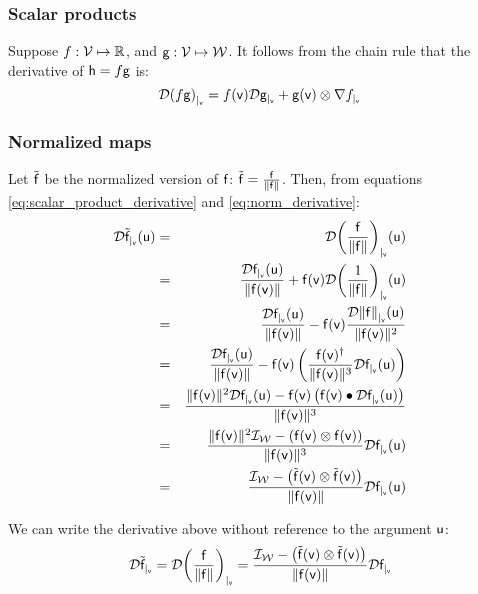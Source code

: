 
\subsubsection{Scalar products}
\label{sec:Scalar-products}

Suppose
$f:\Vspace \mapsto \Reals$, and
$\g:\Vspace \mapsto \Wspace$.
It follows from the chain rule that the derivative of $\h = f\g$ is:
\begin{equation}
\label{eq:scalar_product_derivative}
\Db{(f\g)}{\v} =  f(\v) \Db{\g}{\v} + \g(\v) \otimes \Gb{f}{\v}
\end{equation}



\subsubsection{Normalized maps}
\label{sec:Normalized-maps}

Let $\tilde{\f}$ be the normalized version of $\f$:
$\tilde{\f}  =  \frac{\f}{\| \f \|}$.
Then, from equations \ref{eq:scalar_product_derivative}
and \ref{eq:norm_derivative}:
\begin{eqnarray}
\Dc{\tilde{\f}}{\v}{\u}
& = &
\Dc{\left( \frac{\f}{\| \f \|}\right)}{\v}{\u}
\\
& = &
\frac{\Dc{\f}{\v}{\u}}{ \| \f(\v) \|}
 +
\f(\v)  \Dc{ \left( \frac{1}{\| \f \|} \right) }{\v}{\u} \nonumber \\
& = &
\frac{\Dc{\f}{\v}{\u}}
{\| \f(\v) \|}
 -
\f(\v)
\frac{\Dc{\| \f \|}{\v}{\u}}
{\|\f(\v)\|^2} \nonumber \\
& = &
\frac{\Dc{\f}{\v}{\u}}{ \| \f(\v) \| }
 -
\f(\v) \left( \frac{\f(\v)^\dagger}{\| \f(\v) \|^3}  \Dc{\f}{\v}{\u} \right) \nonumber \\
& = &
\frac{
\| \f(\v) \|^2 \Dc{\f}{\v}{\u}
 -
\f(\v)\left( \f(\v) \bullet \Dc{\f}{\v}{\u} \right)
}
{\| \f(\v) \|^3}  \nonumber \\
& = &
\frac{\| \f(\v) \|^2 \Identity_{\Wspace} - \left( \f(\v) \otimes \f(\v) \right)  }
{ \| \f(\v) \|^3 }
\Dc{\f}{\v}{\u} \nonumber \\
& = &
\frac{\Identity_{\Wspace} - \left( \tilde{\f}(\v) \otimes \tilde{\f}(\v) \right)  }
{\| \f(\v) \|}
\Dc{\f}{\v}{\u} \nonumber
\end{eqnarray}


We can write the derivative above without reference to the argument $\u$:
\begin{equation}
\label{eq:normalized_function_derivative}
\Db{\tilde{\f}}{\v}
 =
\Db{\left( \frac{\f}{\| \f \|} \right)}{\v}
 =
\frac{\Identity_{\Wspace} - \left( \tilde{\f}(\v) \otimes \tilde{\f}(\v) \right) }
{ \| \f(\v) \| }
\Db{\f}{\v}
\end{equation}

